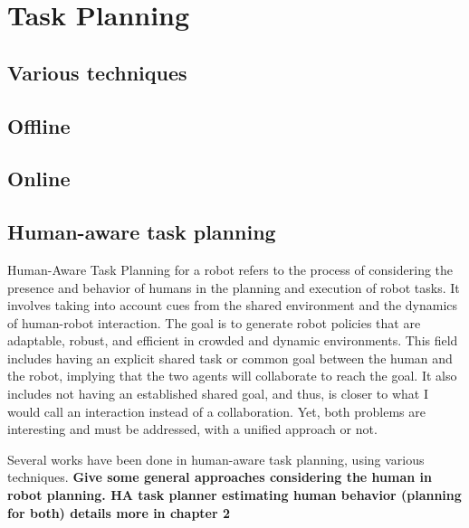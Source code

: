 \section{Task Planning}

\subsection{Various techniques}
\subsection{Offline}
\subsection{Online}
\subsection{Human-aware task planning}
Human-Aware Task Planning for a robot refers to the process of considering the presence and behavior of humans in the planning and execution of robot tasks. It involves taking into account cues from the shared environment and the dynamics of human-robot interaction. The goal is to generate robot policies that are adaptable, robust, and efficient in crowded and dynamic environments. This field includes having an explicit shared task or common goal between the human and the robot, implying that the two agents will collaborate to reach the goal. It also includes not having an established shared goal, and thus, is closer to what I would call an interaction instead of a collaboration. Yet, both problems are interesting and must be addressed, with a unified approach or not. 

Several works have been done in human-aware task planning, using various techniques.
\textbf{Give some general approaches considering the human in robot planning. HA task planner estimating human behavior (planning for both) details more in chapter 2}


